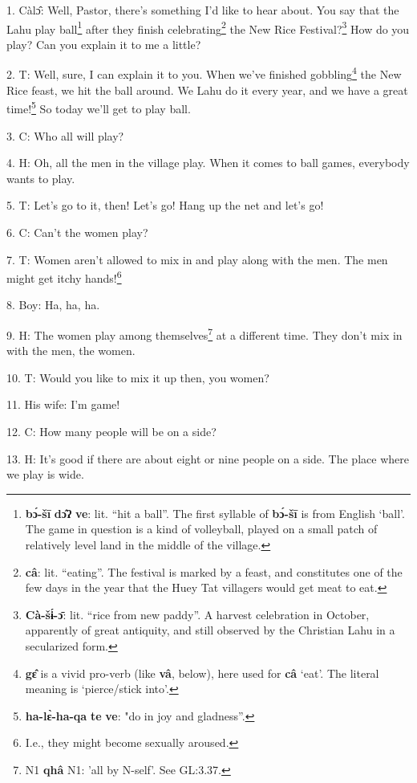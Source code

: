 \setcounter{footnote}{0}

1. Càlɔ̂: Well, Pastor, there's something I'd like to hear about. You say that
the Lahu play ball\footnote{\textbf{bɔ́-šī} \textbf{dɔ̂ʔ} \textbf{ve}: lit. ``hit a ball''. The first syllable of \textbf{bɔ́-šī} is from English `ball'. The game in question is a kind of volleyball, played on a small patch of relatively level land in the middle of the village.} after they finish celebrating\footnote{\textbf{câ}: lit. ``eating''. The festival is marked by a feast, and constitutes one of the few days in the year that the Huey Tat villagers would get meat to eat.} the New Rice Festival?\footnote{\textbf{Cà-šɨ́-ɔ̄}: lit. ``rice from new paddy''. A harvest celebration in October, apparently of great antiquity, and still observed by the Christian Lahu in a secularized form.}
How do you play? Can you explain it to me a little?

2. T: Well, sure, I can explain it to you. When we've finished gobbling\footnote{\textbf{gɛ̂} is a vivid pro-verb (like \textbf{vâ}, below), here used for \textbf{câ} `eat'. The literal meaning is `pierce/stick into'.} the New
Rice feast, we hit the ball around. We Lahu do it every year, and we have a great
time!\footnote{\textbf{ha-lɛ̀-ha-qa} \textbf{te} \textbf{ve}: "do in joy and gladness''.} So today we'll get to play ball.

3. C: Who all will play?

4. H: Oh, all the men in the village play. When it comes to ball games, everybody
wants to play.

5. T: Let's go to it, then! Let's go! Hang up the net and let's go!

6. C: Can't the women play?

7. T: Women aren't allowed to mix in and play along with the men. The men might
get itchy hands!\footnote{I.e., they might become sexually aroused.}

8. Boy: Ha, ha, ha.

9. H: The women play among themselves\footnote{N1 \textbf{qhâ} N1: 'all by N-self'. See GL:3.37.} at a different time. They don't mix in
with the men, the women.

10. T: Would you like to mix it up then, you women?

11. His wife: I'm game!


12. C: How many people will be on a side?

13. H: It's good if there are about eight or nine people on a side. The place where
we play is wide.

